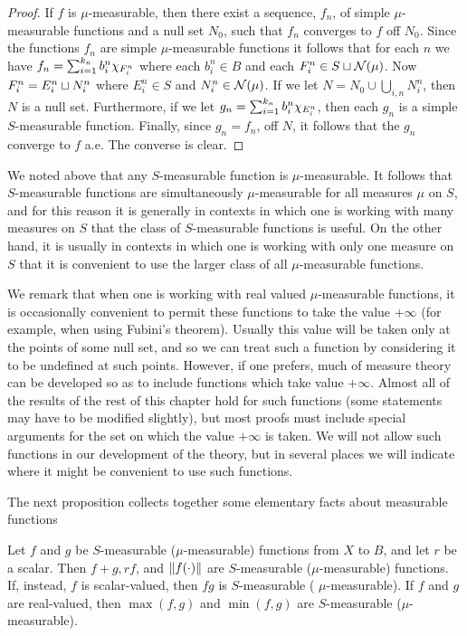 \begin{proof}
If $f$ is $\mu$-measurable, then there exist a sequence, $f_n$, of simple $\mu$-measurable functions and a null set $N_0$, such that $f_n$ converges to $f$ off $N_0$. Since the functions $f_n$ are simple $\mu$-measurable functions it follows that for each $n$ we have $f_n=\sum_{i=1}^{k_n}b_i^n\chi_{F_i^n}$ where each $b_i^n \in B$ and each $F_i^n \in S\sqcup{\cal N}(\mu)$. Now $F_i^n=E_i^n \sqcup N_i^n$ where $E_i^n \in S$ and $N_i^n \in {\cal N}(\mu)$. If we let $N=N_0 \cup \bigcup_{i, n} N_i^n$, then $N$ is a null set. Furthermore, if we let $g_n=\sum_{i=1}^{k_n} b_i^n \chi_{E_i^n}$, then each $g_n$ is a simple $S$-measurable function. Finally, since $g_n=f_n$, off $N$, it follows that the $g_n$ converge to $f$ a.e. The converse is clear.
\end{proof}

We noted above that any $S$-measurable function is $\mu$-measurable. It follows that $S$-measurable functions are simultaneously $\mu$-measurable for all measures $\mu$ on $S$, and for this reason it is generally in contexts in which one is working with many measures on $S$ that the class of $S$-measurable functions is useful. On the other hand, it is usually in contexts in which one is working with only one measure on $S$ that it is convenient to use the larger class of all $\mu$-measurable functions.

We remark that when one is working with real valued $\mu$-measurable functions, it is occasionally convenient to permit these functions to take the value $+\infty$ (for example, when using Fubini's theorem). Usually this value will be taken only at the points of some null set, and so we can treat such a function by considering it to be undefined at such points. However, if one prefers, much of measure theory can be developed so as to include functions which take value $+\infty$. Almost all of the results of the rest of this chapter hold for such functions (some statements may have to be modified slightly), but most proofs must include special arguments for the set on which the value $+\infty$ is taken. We will not allow such functions in our development of the theory, but in several places we will indicate where it might be convenient to use such functions.

The next proposition collects together some elementary facts about measurable functions

\begin{proposition}
Let $f$ and $g$ be $S$-measurable ($\mu$-measurable) functions from $X$ to $B$, and let $r$ be a scalar. Then $f+g, rf$, and $\norm{f(\cdot)}$ are $S$-measurable ($\mu$-measurable) functions. If, instead, $f$ is scalar-valued, then $fg$ is $S$-measurable ( $\mu$-measurable). If $f$ and $g$ are real-valued, then $\max(f, g)$ and $\min(f, g)$ are $S$-measurable ($\mu$-measurable).
\end{proposition}

